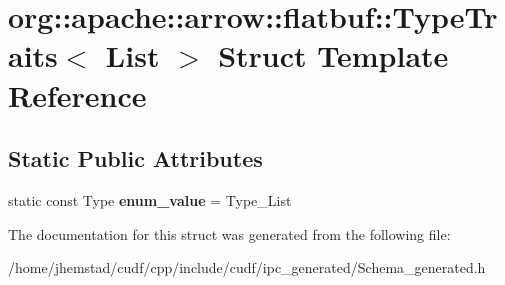 \hypertarget{structorg_1_1apache_1_1arrow_1_1flatbuf_1_1TypeTraits_3_01List_01_4}{}\section{org\+:\+:apache\+:\+:arrow\+:\+:flatbuf\+:\+:Type\+Traits$<$ List $>$ Struct Template Reference}
\label{structorg_1_1apache_1_1arrow_1_1flatbuf_1_1TypeTraits_3_01List_01_4}
\subsection*{Static Public Attributes}
\begin{DoxyCompactItemize}
\item 
static const Type {\bfseries enum\+\_\+value} = Type\+\_\+\+List\hypertarget{structorg_1_1apache_1_1arrow_1_1flatbuf_1_1TypeTraits_3_01List_01_4_a0c93ec5e5b642f4d8d1e123ba88ec43a}{}\label{structorg_1_1apache_1_1arrow_1_1flatbuf_1_1TypeTraits_3_01List_01_4_a0c93ec5e5b642f4d8d1e123ba88ec43a}

\end{DoxyCompactItemize}


The documentation for this struct was generated from the following file\+:\begin{DoxyCompactItemize}
\item 
/home/jhemstad/cudf/cpp/include/cudf/ipc\+\_\+generated/Schema\+\_\+generated.\+h\end{DoxyCompactItemize}
